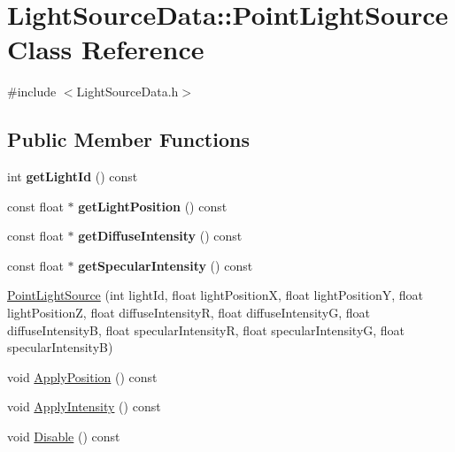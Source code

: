 \hypertarget{classLightSourceData_1_1PointLightSource}{}\section{Light\+Source\+Data\+::Point\+Light\+Source Class Reference}
\label{classLightSourceData_1_1PointLightSource}


{\ttfamily \#include $<$Light\+Source\+Data.\+h$>$}

\subsection*{Public Member Functions}
\begin{DoxyCompactItemize}
\item 
\mbox{\label{classLightSourceData_1_1PointLightSource_a0d2c4297a703d32f03ba696572aebed4}} 
int {\bfseries get\+Light\+Id} () const
\item 
\mbox{\label{classLightSourceData_1_1PointLightSource_ac490a0e2a2d43008a8384d0d695c41ce}} 
const float $\ast$ {\bfseries get\+Light\+Position} () const
\item 
\mbox{\label{classLightSourceData_1_1PointLightSource_a78116b2a3140d09b00e3274880384fad}} 
const float $\ast$ {\bfseries get\+Diffuse\+Intensity} () const
\item 
\mbox{\label{classLightSourceData_1_1PointLightSource_af9ead483eac788227dff6d238c8e272b}} 
const float $\ast$ {\bfseries get\+Specular\+Intensity} () const
\item 
\mbox{\hyperlink{classLightSourceData_1_1PointLightSource_a1906b6949e0f33893ee3e5e00ebca9f5}{Point\+Light\+Source}} (int light\+Id, float light\+PositionX, float light\+PositionY, float light\+PositionZ, float diffuse\+IntensityR, float diffuse\+IntensityG, float diffuse\+IntensityB, float specular\+IntensityR, float specular\+IntensityG, float specular\+IntensityB)
\item 
void \mbox{\hyperlink{classLightSourceData_1_1PointLightSource_a68330385482fc307c08f9ceab24eea90}{Apply\+Position}} () const
\item 
void \mbox{\hyperlink{classLightSourceData_1_1PointLightSource_a6472e0a17c2d31f5eb5a98bf313f0938}{Apply\+Intensity}} () const
\item 
void \mbox{\hyperlink{classLightSourceData_1_1PointLightSource_ac350b9eb76b71d6498c12ba3bbb73981}{Disable}} () const
\end{DoxyCompactItemize}


